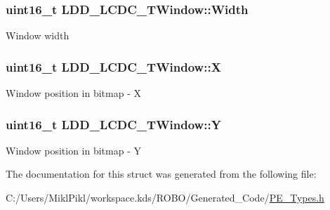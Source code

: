 \subsubsection[{Width}]{\setlength{\rightskip}{0pt plus 5cm}uint16\+\_\+t L\+D\+D\+\_\+\+L\+C\+D\+C\+\_\+\+T\+Window\+::\+Width}\label{struct_l_d_d___l_c_d_c___t_window_a53ee53813f5884a400be8ca3093233c4}
Window width \hypertarget{struct_l_d_d___l_c_d_c___t_window_a9dd1270e9794b4dbd79b2b30afca87c9}{}
\subsubsection[{X}]{\setlength{\rightskip}{0pt plus 5cm}uint16\+\_\+t L\+D\+D\+\_\+\+L\+C\+D\+C\+\_\+\+T\+Window\+::\+X}\label{struct_l_d_d___l_c_d_c___t_window_a9dd1270e9794b4dbd79b2b30afca87c9}
Window position in bitmap -\/ X \hypertarget{struct_l_d_d___l_c_d_c___t_window_af64f532d1fb5899c563ba40df90867d8}{}
\subsubsection[{Y}]{\setlength{\rightskip}{0pt plus 5cm}uint16\+\_\+t L\+D\+D\+\_\+\+L\+C\+D\+C\+\_\+\+T\+Window\+::\+Y}\label{struct_l_d_d___l_c_d_c___t_window_af64f532d1fb5899c563ba40df90867d8}
Window position in bitmap -\/ Y 

The documentation for this struct was generated from the following file\+:\begin{DoxyCompactItemize}
\item 
C\+:/\+Users/\+Mikl\+Pikl/workspace.\+kds/\+R\+O\+B\+O/\+Generated\+\_\+\+Code/\hyperlink{_p_e___types_8h}{P\+E\+\_\+\+Types.\+h}\end{DoxyCompactItemize}
